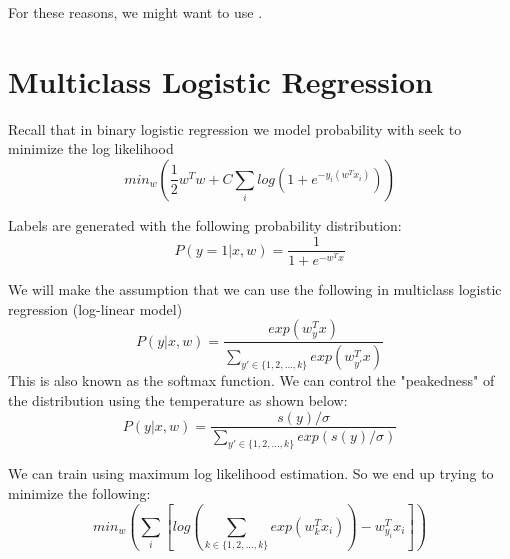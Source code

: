 For these reasons, we might want to use .

\section{Multiclass Logistic Regression}

Recall that in binary logistic regression we model probability with seek to minimize the log likelihood
\[
    min_w(\frac{1}{2}w^Tw + C \sum_i log(1 + e^{-y_i(w^Tx_i)}))  
\]

Labels are generated with the following probability distribution:
\[
    P(y = 1|x, w)  = \frac{1}{1+e^{-w^Tx}}
\]

We will make the assumption that we can use the following in multiclass logistic regression (log-linear model)
\[
    P(y|x, w) = \frac{exp(w_y^Tx)}{\sum_{y' \in \{1, 2,...,k\}}exp(w_{y'}^Tx)}
\]
This is also known as the softmax function. We can control the "peakedness" of the distribution using the temperature as shown below:
\[
    P(y|x, w) = \frac{s(y) / \sigma}{\sum_{y' \in \{1, 2,...,k\}}exp(s(y) / \sigma)} 
\]

We can train using maximum log likelihood estimation. So we end up trying to minimize the following:
\[
    min_w (\sum_i[log(\sum_{k \in \{1,2,...,k\}} exp(w_k^Tx_i)) - w_{y_i}^Tx_i])  
\]
